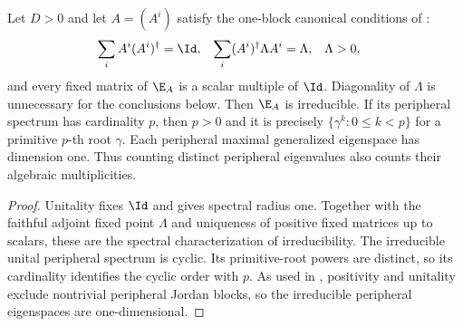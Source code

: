 \begin{lemma}
    \label{thm:pgvwc07_unital_canonical_spectrum}
    \leanok
    Let $D>0$ and let $A=(A^i)$ satisfy the one-block canonical conditions
    of \cite[Theorem~4]{PerezGarcia2007Matrix}:
    \begin{align}
        \sum_i A^i(A^i)^\dagger        & =\Id,     &
        \sum_i(A^i)^\dagger\Lambda A^i & =\Lambda, & \Lambda & >0,
        \label{eq:pgvwc07_unital_canonical_conditions}
    \end{align}
    and every fixed matrix of $\E_A$ is a scalar multiple of $\Id$.
    Diagonality of $\Lambda$ is unnecessary for the conclusions below.
    Then $\E_A$ is irreducible. If its peripheral spectrum has cardinality
    $p$, then $p>0$ and it is precisely
    $\{\gamma^k:0\leq k<p\}$ for a primitive $p$-th root $\gamma$.
    Each peripheral maximal generalized eigenspace has dimension one.
    Thus counting distinct peripheral eigenvalues also counts their
    algebraic multiplicities.
\end{lemma}

\begin{proof}
    \leanok
    Unitality fixes $\Id$ and gives spectral radius one. Together with the
    faithful adjoint fixed point $\Lambda$ and uniqueness of positive fixed
    matrices up to scalars, these are the spectral characterization of
    irreducibility. The irreducible unital peripheral spectrum is cyclic.
    Its primitive-root powers are distinct, so its cardinality identifies
    the cyclic order with $p$. As used in
    \cite[proof of Theorem~5]{PerezGarcia2007Matrix}, positivity and unitality
    exclude nontrivial peripheral Jordan blocks, so the irreducible peripheral
    eigenspaces are one-dimensional.
\end{proof}

